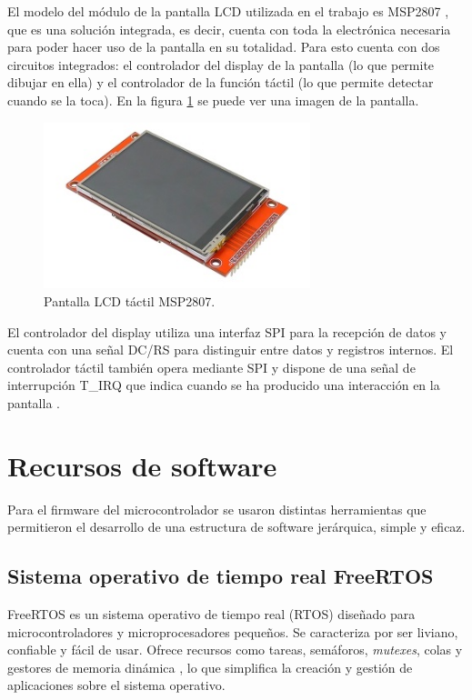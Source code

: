 El modelo del módulo de la pantalla LCD utilizada en el trabajo es MSP2807 \citep{MSP2807}, que es una solución integrada, es decir, cuenta con toda la electrónica necesaria para poder hacer uso de la pantalla en su totalidad. Para esto cuenta con dos circuitos integrados: el controlador del display de la pantalla (lo que permite dibujar en ella) y el controlador de la función táctil (lo que permite detectar cuando se la toca). En la figura \ref{fig:pantLCD} se puede ver una imagen de la pantalla.

\begin{figure}[H]
\centering
\includegraphics[width=0.69\textwidth]{./Figures/pant_LCD.png}
\caption{Pantalla LCD táctil MSP2807\protect\footnotemark.}
\label{fig:pantLCD}
\end{figure}


El controlador del display utiliza una interfaz SPI para la recepción de datos y cuenta con una señal DC/RS para distinguir entre datos y registros internos. El controlador táctil también opera mediante SPI y dispone de una señal de interrupción T\_IRQ que indica cuando se ha producido una interacción en la pantalla \citep{MSP2807}.

\section{Recursos de software}

Para el firmware del microcontrolador se usaron distintas herramientas que permitieron el desarrollo de una estructura de software jerárquica, simple y eficaz.

\subsection{Sistema operativo de tiempo real FreeRTOS}

FreeRTOS es un sistema operativo de tiempo real (RTOS) diseñado para microcontroladores y microprocesadores pequeños. Se caracteriza por ser liviano, confiable y fácil de usar. Ofrece recursos como tareas, semáforos, \textit{mutexes}, colas y gestores de memoria dinámica \citep{WEBSITE:1}, lo que simplifica la creación y gestión de aplicaciones sobre el sistema operativo.

